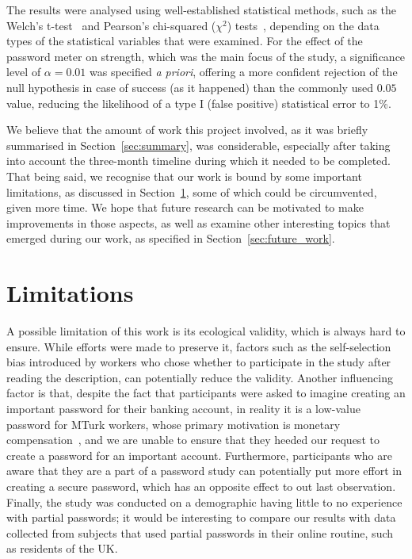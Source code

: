     The results were analysed using well-established statistical methods, such as the Welch's t-test~\cite{t_test} and Pearson's chi-squared ($\chi^2$) tests~\cite{chi_sq}, depending on the data types of the statistical variables that were examined. For the effect of the password meter on strength, which was the main focus of the study, a significance level of $\alpha = 0.01$ was specified \emph{a priori}, offering a more confident rejection of the null hypothesis in case of success (as it happened) than the commonly used $0.05$ value, reducing the likelihood of a type I (false positive) statistical error to 1\%.

    We believe that the amount of work this project involved, as it was briefly summarised in Section~\ref{sec:summary}, was considerable, especially after taking into account the three-month timeline during which it needed to be completed. That being said, we recognise that our work is bound by some important limitations, as discussed in Section~\ref{sec:limitations}, some of which could be circumvented, given more time. We hope that future research can be motivated to make improvements in those aspects, as well as examine other interesting topics that emerged during our work, as specified in Section~\ref{sec:future_work}.


  \section{Limitations}
    \label{sec:limitations}
    A possible limitation of this work is its ecological validity, which is always hard to ensure. While efforts were made to preserve it, factors such as the self-selection bias introduced by workers who chose whether to participate in the study after reading the description, can potentially reduce the validity. Another influencing factor is that, despite the fact that participants were asked to imagine creating an important password for their banking account, in reality it is a low-value password for MTurk workers, whose primary motivation is monetary compensation~\cite{mturk_demographic}, and we are unable to ensure that they heeded our request to create a password for an important account. Furthermore, participants who are aware that they are a part of a password study can potentially put more effort in creating a secure password, which has an opposite effect to out last observation. Finally, the study was conducted on a demographic having little to no experience with partial passwords; it would be interesting to compare our results with data collected from subjects that used partial passwords in their online routine, such as residents of the UK.

